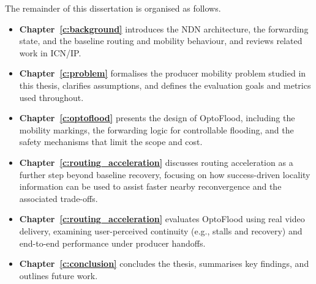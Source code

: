 The remainder of this dissertation is organised as follows.
\begin{itemize}
  \item \textbf{Chapter~\ref{c:background}} introduces the NDN architecture, the forwarding state, and the baseline routing and mobility behaviour, and reviews related work in ICN/IP.
  \item \textbf{Chapter~\ref{c:problem}} formalises the producer mobility problem studied in this thesis, clarifies assumptions, and defines the evaluation goals and metrics used throughout.
  \item \textbf{Chapter~\ref{c:optoflood}} presents the design of OptoFlood, including the mobility markings, the forwarding logic for controllable flooding, and the safety mechanisms that limit the scope and cost.
  \item \textbf{Chapter~\ref{c:routing_acceleration}} discusses routing acceleration as a further step beyond baseline recovery, focusing on how success-driven locality information can be used to assist faster nearby reconvergence and the associated trade-offs.
  \item \textbf{Chapter~\ref{c:routing_acceleration}} evaluates OptoFlood using real video delivery, examining user-perceived continuity (e.g., stalls and recovery) and end-to-end performance under producer handoffs.
  \item \textbf{Chapter~\ref{c:conclusion}} concludes the thesis, summarises key findings, and outlines future work.
\end{itemize}
